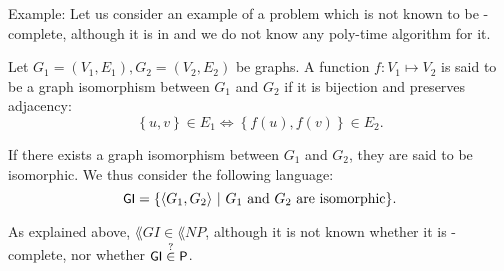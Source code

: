 \documentclass[a4paper]{article}
\begin{document}
\begin{parag}{Example: }
    Let us consider an example of a problem which is not known to be -complete, although it is in  and we do not know any poly-time algorithm for it.

    Let $G_1 = \left(V_1, E_1\right), G_2 = \left(V_2, E_2\right)$ be graphs. A function $f: V_1 \mapsto V_2$ is said to be a graph isomorphism between $G_1$ and $G_2$ if it is bijection and preserves adjacency: 
    \[\left\{u, v\right\} \in E_1 \iff \left\{f\left(u\right), f\left(v\right)\right\} \in E_2.\]

    If there exists a graph isomorphism between $G_1$ and $G_2$, they are said to be isomorphic. We thus consider the following language: 
    \[\lang{GI} = \left\{\left\langle G_1, G_2 \right\rangle \suchthat \text{$G_1$ and $G_2$ are isomorphic}\right\}.\]

    As explained above, $\lang{GI} \in \lang{NP}$, although it is not known whether it is -complete, nor whether $\lang{GI} \over{\in}{?} \lang{P}$.
\end{parag}
\end{document}
